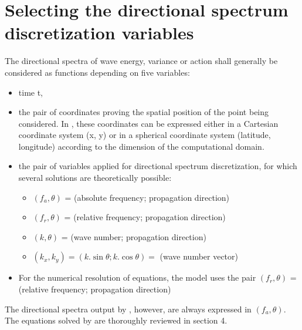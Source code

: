 \section{ Selecting the directional spectrum discretization variables}
\label{se:selecting}
 The directional spectra of wave energy, variance or action shall generally be considered as functions depending on five variables:
\begin{itemize}
 \item time t,

 \item the pair of coordinates proving the spatial position of the point being considered. In \tomawac, these coordinates can be expressed either in a Cartesian coordinate system (x, y) or in a spherical coordinate system (latitude, longitude) according to the dimension of the computational domain.

 \item the pair of variables applied for directional spectrum discretization, for which several solutions are theoretically possible:
\begin{itemize}

    \item$(f_a,\theta)$ = (absolute frequency; propagation direction)

    \item$(f_r,\theta)$ = (relative frequency; propagation direction)

    \item$(k,\theta)$ = (wave number; propagation direction)

    \item$(k_x,k_y) = (k.\sin \theta ; k.\cos \theta) =$ (wave number vector)
\end{itemize}
\end{itemize}

 \begin{itemize}
\item For the numerical resolution of equations, the model \tomawac uses the pair $(f_r,\theta)$ = (relative frequency; propagation direction)
\end{itemize}
 The directional spectra output by \tomawac, however, are always expressed in $(f_a,\theta)$. The equations solved by \tomawac are thoroughly reviewed in section 4.

